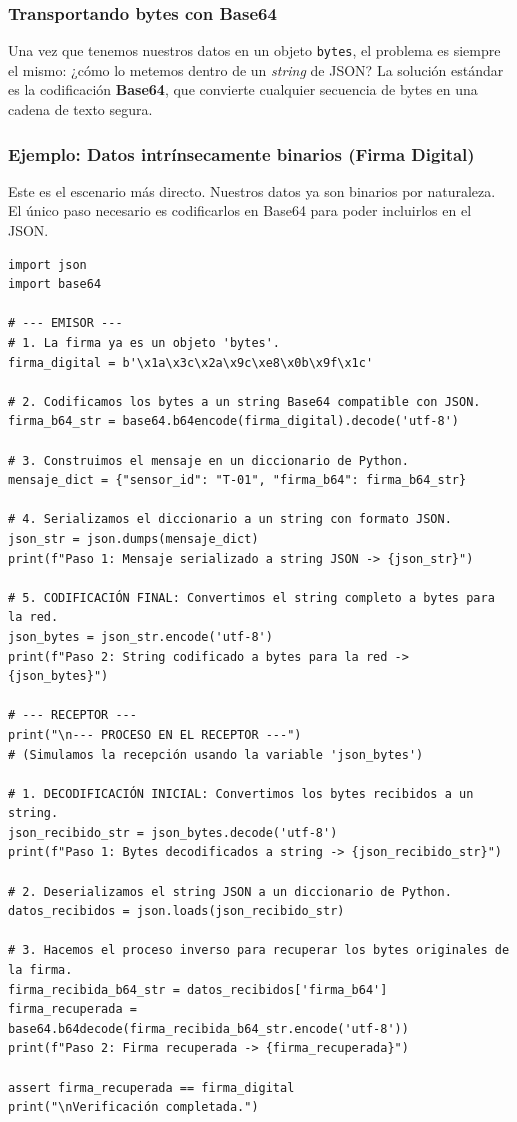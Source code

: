 \subsubsection{Transportando bytes con Base64}

Una vez que tenemos nuestros datos en un objeto \texttt{bytes}, el problema es siempre el mismo: ¿cómo lo metemos dentro de un \textit{string} de JSON? La solución estándar es la codificación \textbf{Base64}, que convierte cualquier secuencia de bytes en una cadena de texto segura.

\subsubsection*{Ejemplo: Datos intrínsecamente binarios (Firma Digital)}
Este es el escenario más directo. Nuestros datos ya son binarios por naturaleza. El único paso necesario es codificarlos en Base64 para poder incluirlos en el JSON.

\begin{lstlisting}[style=PythonStyle, caption={Ciclo completo para enviar una firma digital en JSON.}]
import json
import base64

# --- EMISOR ---
# 1. La firma ya es un objeto 'bytes'.
firma_digital = b'\x1a\x3c\x2a\x9c\xe8\x0b\x9f\x1c'

# 2. Codificamos los bytes a un string Base64 compatible con JSON.
firma_b64_str = base64.b64encode(firma_digital).decode('utf-8')

# 3. Construimos el mensaje en un diccionario de Python.
mensaje_dict = {"sensor_id": "T-01", "firma_b64": firma_b64_str}

# 4. Serializamos el diccionario a un string con formato JSON.
json_str = json.dumps(mensaje_dict)
print(f"Paso 1: Mensaje serializado a string JSON -> {json_str}")

# 5. CODIFICACIÓN FINAL: Convertimos el string completo a bytes para la red.
json_bytes = json_str.encode('utf-8')
print(f"Paso 2: String codificado a bytes para la red -> {json_bytes}")

# --- RECEPTOR ---
print("\n--- PROCESO EN EL RECEPTOR ---")
# (Simulamos la recepción usando la variable 'json_bytes')

# 1. DECODIFICACIÓN INICIAL: Convertimos los bytes recibidos a un string.
json_recibido_str = json_bytes.decode('utf-8')
print(f"Paso 1: Bytes decodificados a string -> {json_recibido_str}")

# 2. Deserializamos el string JSON a un diccionario de Python.
datos_recibidos = json.loads(json_recibido_str)

# 3. Hacemos el proceso inverso para recuperar los bytes originales de la firma.
firma_recibida_b64_str = datos_recibidos['firma_b64']
firma_recuperada = base64.b64decode(firma_recibida_b64_str.encode('utf-8'))
print(f"Paso 2: Firma recuperada -> {firma_recuperada}")

assert firma_recuperada == firma_digital
print("\nVerificación completada.")
\end{lstlisting}

